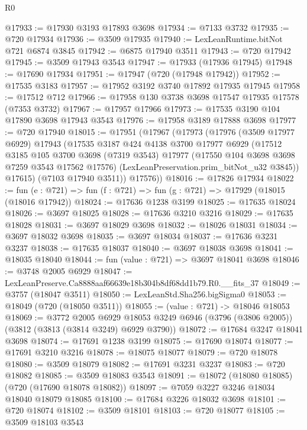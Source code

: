 \begin{lexlean}{R0}
\begin{coremodule}
@17933 := @17930 @3193 @17893 @3698
@17934 := @7133 @3732
@17935 := @720 @17934
@17936 := @3509 @17935
@17940 := LexLeanRuntime.bitNot @721 @6874 @3845
@17942 := @6875 @17940 @3511
@17943 := @720 @17942
@17945 := @3509 @17943 @3543
@17947 := @17933 (@17936 @17945)
@17948 := @17690 @17934
@17951 := @17947 (@720 (@17948 @17942))
@17952 := @17535 @3183
@17957 := @17952 @3192 @3740 @17892 @17935 @17945
@17958 := @17512 @712
@17966 := @17958 @130 @3738 @3698 @17547 @17935 @17578 (@7353 @3732)
@17967 := @17957 @17966
@17973 := @17535 @3190 @104 @17890 @3698 @17943 @3543
@17976 := @17958 @3189 @17888 @3698
@17977 := @720 @17940
@18015 := @17951
    (@17967
      (@17973
        (@17976
          (@3509 @17977 @6929)
          @17943
          (@17535
            @3187
            @424
            @4138
            @3700
            @17977
            @6929
            (@17512
              @3185
              @105
              @3700
              @3698
              (@7319 @3543)
              @17977
              (@17550 @104 @3698 @3698 @7259 @3543 @17562 @17576)
              (LexLeanPreservation.prim_bitNot_u32 @3845))
            @17615)
          (@7103 @17940 @3511))
        @17576))
@18016 := @17826 @17934
@18022 := fun (e : @721) => fun (f : @721) => fun (g : @721) => @17929 (@18015 (@18016 @17942))
@18024 := @17636 @1238 @3199
@18025 := @17635 @18024
@18026 := @3697 @18025
@18028 := @17636 @3210 @3216
@18029 := @17635 @18028
@18031 := @3697 @18029 @3698
@18032 := @18026 @18031
@18034 := @3697 @18032 @3698
@18035 := @3697 @18034
@18037 := @17636 @3231 @3237
@18038 := @17635 @18037
@18040 := @3697 @18038 @3698
@18041 := @18035 @18040
@18044 := fun (value : @721) => @3697 @18041 @3698
@18046 := @3748 @2005 @6929
@18047 := LexLeanPreserve.Ca8888aaf66639e18b304b8df68dd1b79.R0.__fits_37
@18049 := @3757 (@18047 @3511)
@18050 := LexLeanStd.Sha256.bigSigma0
@18053 := @18049 (@720 (@18050 @3511))
@18055 := (value : @721) -> @18046 @18053
@18069 := @3772
    @2005
    @6929
    @18053
    @3249
    @6946
    (@3796 (@3806 @2005))
    (@3812 (@3813 (@3814 @3249) @6929 @3790))
@18072 := @17684 @3247 @18041 @3698
@18074 := @17691 @1238 @3199
@18075 := @17690 @18074
@18077 := @17691 @3210 @3216
@18078 := @18075 @18077
@18079 := @720 @18078
@18080 := @3509 @18079
@18082 := @17691 @3231 @3237
@18083 := @720 @18082
@18085 := @3509 @18083 @3543
@18091 := @18072 (@18080 @18085) (@720 (@17690 @18078 @18082))
@18097 := @7059 @3227 @3246 @18034 @18040 @18079 @18085
@18100 := @17684 @3226 @18032 @3698
@18101 := @720 @18074
@18102 := @3509 @18101
@18103 := @720 @18077
@18105 := @3509 @18103 @3543

\end{coremodule}
\end{lexlean}
